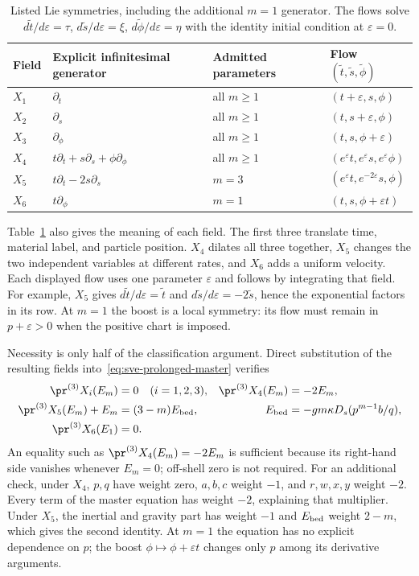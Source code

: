\begin{table}[htbp]
\centering\small
\begin{tabularx}{\linewidth}{@{}lXll@{}}
\toprule
Field & Explicit infinitesimal generator & Admitted parameters & Flow $(\widetilde t,\widetilde s,\widetilde\phi)$\\
\midrule
$X_1$ & $\partial_t$ & all $m\geq1$ & $(t+\varepsilon,s,\phi)$\\
$X_2$ & $\partial_s$ & all $m\geq1$ & $(t,s+\varepsilon,\phi)$\\
$X_3$ & $\partial_\phi$ & all $m\geq1$ & $(t,s,\phi+\varepsilon)$\\
$X_4$ & $t\partial_t+s\partial_s+\phi\partial_\phi$ & all $m\geq1$ & $(e^\varepsilon t,e^\varepsilon s,e^\varepsilon\phi)$\\
$X_5$ & $t\partial_t-2s\partial_s$ & $m=3$ & $(e^\varepsilon t,e^{-2\varepsilon}s,\phi)$\\
$X_6$ & $t\partial_\phi$ & $m=1$ & $(t,s,\phi+\varepsilon t)$\\
\bottomrule
\end{tabularx}
\caption{Listed Lie symmetries, including the additional $m=1$ generator.
The flows solve $d\widetilde t/d\varepsilon=\tau$,
$d\widetilde s/d\varepsilon=\xi$, $d\widetilde\phi/d\varepsilon=\eta$
with the identity initial condition at $\varepsilon=0$.}
\label{tab:sve-generators}
\end{table}

Table~\ref{tab:sve-generators} also gives the meaning of each field.
The first three translate time, material label, and particle position.
$X_4$ dilates all three together, $X_5$ changes the two independent
variables at different rates, and $X_6$ adds a uniform velocity.
Each displayed flow uses one parameter $\varepsilon$ and follows by
integrating that field. For example, $X_5$ gives
$d\widetilde t/d\varepsilon=\widetilde t$ and
$d\widetilde s/d\varepsilon=-2\widetilde s$, hence the exponential
factors in its row. At $m=1$ the boost is a local symmetry: its flow must
remain in $p+\varepsilon>0$ when the positive chart is imposed.

Necessity is only half of the classification argument. Direct substitution
of the resulting fields into~\eqref{eq:sve-prolonged-master} verifies
\begin{align}
 \pr^{(3)}X_i(E_m)&=0\quad(i=1,2,3),&
 \pr^{(3)}X_4(E_m)&=-2E_m,\notag\\
 \pr^{(3)}X_5(E_m)+E_m&=(3-m)E_{\rm bed},&
 E_{\rm bed}&=-gm\kappa D_s(p^{m-1}b/q),\notag\\
 \pr^{(3)}X_6(E_1)&=0.
 \label{eq:sve-offshell-certificates}
\end{align}
An equality such as $\pr^{(3)}X_4(E_m)=-2E_m$ is sufficient because its
right-hand side vanishes whenever $E_m=0$; off-shell zero is not required.
For an additional check, under $X_4$, $p,q$ have weight zero, $a,b,c$
weight $-1$, and $r,w,x,y$ weight $-2$. Every term of the master equation
has weight $-2$, explaining that multiplier. Under $X_5$, the inertial
and gravity part has weight $-1$ and $E_{\rm bed}$ weight $2-m$,
which gives the second identity. At $m=1$ the equation has no explicit
dependence on $p$; the boost $\phi\mapsto\phi+\varepsilon t$ changes
only $p$ among its derivative arguments.

